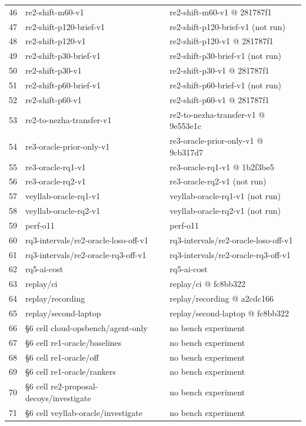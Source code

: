 \begin{longtable}{@{}r>{\raggedright\arraybackslash}p{108.0pt}>{\raggedright\arraybackslash}p{108.0pt}@{}}
46 & re2-shift-m60-v1 & re2-shift-m60-v1 @ 281787f1 \\
47 & re2-shift-p120-brief-v1 & re2-shift-p120-brief-v1 (not run) \\
48 & re2-shift-p120-v1 & re2-shift-p120-v1 @ 281787f1 \\
49 & re2-shift-p30-brief-v1 & re2-shift-p30-brief-v1 (not run) \\
50 & re2-shift-p30-v1 & re2-shift-p30-v1 @ 281787f1 \\
51 & re2-shift-p60-brief-v1 & re2-shift-p60-brief-v1 (not run) \\
52 & re2-shift-p60-v1 & re2-shift-p60-v1 @ 281787f1 \\
53 & re2-to-nezha-transfer-v1 & re2-to-nezha-transfer-v1 @ 9e553e1c \\
54 & re3-oracle-prior-only-v1 & re3-oracle-prior-only-v1 @ 9cb317d7 \\
55 & re3-oracle-rq1-v1 & re3-oracle-rq1-v1 @ 1b2f3be5 \\
56 & re3-oracle-rq2-v1 & re3-oracle-rq2-v1 (not run) \\
57 & veyllab-oracle-rq1-v1 & veyllab-oracle-rq1-v1 (not run) \\
58 & veyllab-oracle-rq2-v1 & veyllab-oracle-rq2-v1 (not run) \\
59 & perf-o11 & perf-o11 \\
60 & rq3-intervals/re2-oracle-loso-off-v1 & rq3-intervals/re2-oracle-loso-off-v1 \\
61 & rq3-intervals/re2-oracle-rq3-off-v1 & rq3-intervals/re2-oracle-rq3-off-v1 \\
62 & rq5-ai-cost & rq5-ai-cost \\
63 & replay/ci & replay/ci @ fc8bb322 \\
64 & replay/recording & replay/recording @ a2cdc166 \\
65 & replay/second-laptop & replay/second-laptop @ fc8bb322 \\
66 & 04 \S{}6 cell cloud-opsbench/agent-only & no bench experiment \\
67 & 04 \S{}6 cell re1-oracle/baselines & no bench experiment \\
68 & 04 \S{}6 cell re1-oracle/off & no bench experiment \\
69 & 04 \S{}6 cell re1-oracle/rankers & no bench experiment \\
70 & 04 \S{}6 cell re2-proposal-decoys/investigate & no bench experiment \\
71 & 04 \S{}6 cell veyllab-oracle/investigate & no bench experiment \\
\end{longtable}
